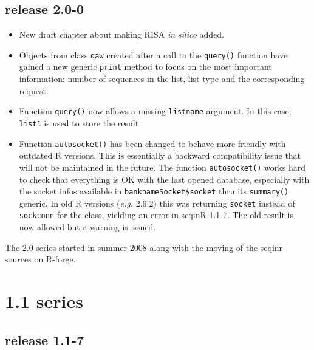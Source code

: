 \documentclass{article}
\begin{document}
\subsection*{release 2.0-0}

\begin{itemize}

\item New draft chapter about making RISA \textit{in silico} added.

\item Objects from class \texttt{qaw} created after a call to the
  \texttt{query()} function have gained a new generic \texttt{print}
  method to focus on the most important information: number
  of sequences in the list, list type and the corresponding request.

\item Function \texttt{query()} now allows a missing \texttt{listname}
  argument. In this case, \texttt{list1} is used to store the
  result.

\item Function \texttt{autosocket()} has been changed to behave more
  friendly with outdated R versions. This is essentially a backward
  compatibility issue that will not be maintained in the future.
  The function \texttt{autosocket()} works hard to check that everything
  is OK with the last opened database, especially with the socket
  infos available in \texttt{banknameSocket\$socket} thru its 
  \texttt{summary()} generic. In old R versions (\textit{e.g.} 2.6.2) this
  was returning \texttt{socket} instead of \texttt{sockconn} for the
  class, yielding an error in seqinR 1.1-7. The old result is now
  allowed but a warning is issued.

\end{itemize}

The 2.0 series started in summer 2008 along with the moving
of the seqinr sources on R-forge.

\section*{1.1 series}

\subsection*{release 1.1-7}
\end{document}
